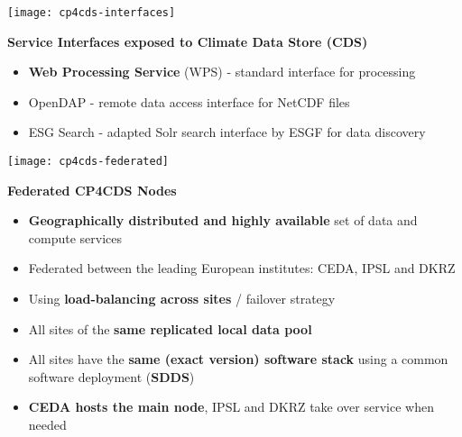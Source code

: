\documentclass[portrait,a0paper,fontscale=0.4]{baposter} %
\newcommand{\compresslist}{%
\setlength{\itemsep}{1pt}%
\setlength{\parskip}{0pt}%
\setlength{\parsep}{0pt}%
}
\begin{document}
\begin{poster}
{  \begin{minipage}{0.4\textwidth}
    \texttt{[image: cp4cds-interfaces]}
  \end{minipage}
  \begin{minipage}{0.6\textwidth}
    {\bf Service Interfaces exposed to Climate Data Store (CDS)}
    \begin{itemize}\compresslist
      \item {\bf Web Processing Service} (WPS) - standard interface for processing
      \item OpenDAP - remote data access interface for NetCDF files
      \item ESG Search - adapted Solr search interface by ESGF for data discovery
    \end{itemize}
 \end{minipage}

 \begin{minipage}{0.4\textwidth}
    \texttt{[image: cp4cds-federated]}
  \end{minipage}
  \begin{minipage}{0.6\textwidth}
    {\bf Federated CP4CDS Nodes}
    \begin{itemize}\compresslist
      \item {\bf Geographically distributed and highly available} set of data and compute services
      \item Federated between the leading European institutes: CEDA, IPSL and DKRZ
      \item Using {\bf load-balancing across sites} / failover strategy
      \item All sites of the {\bf same replicated local data pool}
      \item All sites have the {\bf same (exact version) software stack} using a common software deployment ({\bf SDDS})
      \item {\bf CEDA hosts the main node}, IPSL and DKRZ take over service when needed
    \end{itemize}
  \end{minipage}
 }


\end{poster}
\end{document}
